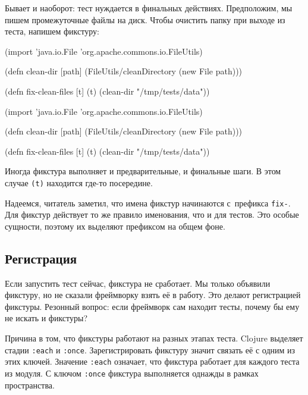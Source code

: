 \fi

\fi

Бывает и наоборот: тест нуждается в финальных действиях. Предположим, мы пишем
промежуточные файлы на диск. Чтобы очистить папку при выходе из теста, напишем
фикстуру:

\pagebreakafive

\ifnarrow

\begin{english}
  \begin{clojure}
(import 'java.io.File
        'org.apache.commons.io.FileUtils)

(defn clean-dir [path]
  (FileUtils/cleanDirectory
    (new File path)))

(defn fix-clean-files [t]
  (t)
  (clean-dir "/tmp/tests/data"))
  \end{clojure}
\end{english}

\else

\begin{english}
  \begin{clojure}
(import 'java.io.File
        'org.apache.commons.io.FileUtils)

(defn clean-dir [path]
  (FileUtils/cleanDirectory (new File path)))

(defn fix-clean-files [t]
  (t)
  (clean-dir "/tmp/tests/data"))
  \end{clojure}
\end{english}

\fi

Иногда фикстура выполняет и предварительные, и финальные шаги. В этом случае
\verb|(t)| находится где-то посередине.

Надеемся, читатель заметил, что имена фикстур начинаются с~префикса
\verb|fix-|. Для фикстур действует то же правило именования, что и для
тестов. Это особые сущности, поэтому их выделяют префиксом на общем фоне.

\subsection{Регистрация}


Если запустить тест сейчас, фикстура не сработает. Мы только объявили фикстуру,
но не сказали фреймворку взять её в работу. Это делают регистрацией фикстуры.
Резонный вопрос: если фреймворк сам находит тесты, почему бы ему не искать и
фикстуры?

Причина в том, что фикстуры работают на разных этапах теста. Clojure выделяет
стадии \verb|:each| и \verb|:once|. Зарегистрировать фикстуру значит связать
её с одним из этих ключей. Значение \verb|:each| означает, что фикстура
работает для каждого теста из модуля. С ключом \verb|:once| фикстура
выполняется однажды в рамках пространства.

